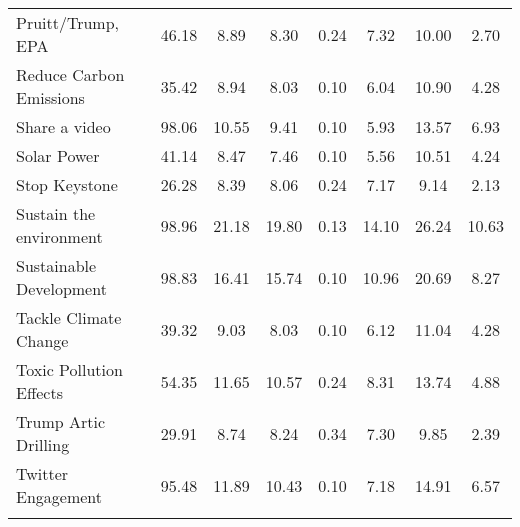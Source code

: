 \begin{longtable}{L|ccccccc}
  Pruitt/Trump, EPA & 46.18 & 8.89 & 8.30 & 0.24 & 7.32 & 10.00 & 2.70 \\ 
  Reduce Carbon Emissions & 35.42 & 8.94 & 8.03 & 0.10 & 6.04 & 10.90 & 4.28 \\ 
  Share a video & 98.06 & 10.55 & 9.41 & 0.10 & 5.93 & 13.57 & 6.93 \\ 
  Solar Power & 41.14 & 8.47 & 7.46 & 0.10 & 5.56 & 10.51 & 4.24 \\ 
  Stop Keystone & 26.28 & 8.39 & 8.06 & 0.24 & 7.17 & 9.14 & 2.13 \\ 
  Sustain the environment & 98.96 & 21.18 & 19.80 & 0.13 & 14.10 & 26.24 & 10.63 \\ 
  Sustainable Development & 98.83 & 16.41 & 15.74 & 0.10 & 10.96 & 20.69 & 8.27 \\ 
  Tackle Climate Change & 39.32 & 9.03 & 8.03 & 0.10 & 6.12 & 11.04 & 4.28 \\ 
  Toxic Pollution Effects & 54.35 & 11.65 & 10.57 & 0.24 & 8.31 & 13.74 & 4.88 \\ 
  Trump Artic Drilling & 29.91 & 8.74 & 8.24 & 0.34 & 7.30 & 9.85 & 2.39 \\ 
  Twitter Engagement & 95.48 & 11.89 & 10.43 & 0.10 & 7.18 & 14.91 & 6.57 \\ 
  \hline
\label{tab:DailyAttIGO}
\end{longtable}
